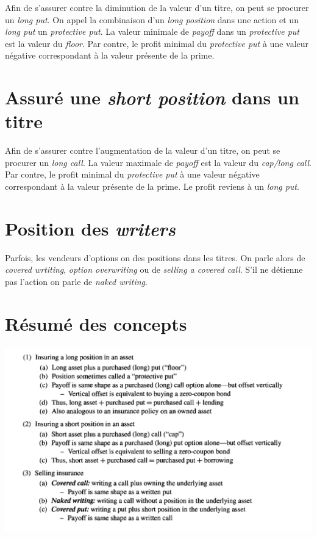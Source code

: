 \documentclass[11pt,french]{report}
\begin{document}
Afin de s'assurer contre la diminution de la valeur d'un titre, on peut se procurer un \emph{long put}. On appel la combinaison d'un \emph{long position} dans une action et un \emph{long put} un \emph{protective put}. La valeur minimale de \emph{payoff} dans un \emph{protective put} est la valeur du \emph{floor}. Par contre, le profit minimal du \emph{protective put} à une valeur négative correspondant à la valeur présente de la prime. 

\section{Assuré une \emph{short position} dans un titre}

Afin de s'assurer contre l'augmentation de la valeur d'un titre, on peut se procurer un \emph{long call}. La valeur maximale de \emph{payoff} est la valeur du \emph{cap/long call}. Par contre, le profit minimal du \emph{protective put} à une valeur négative correspondant à la valeur présente de la prime. Le profit reviens à un \emph{long put}.

\section{Position des \emph{writers}}

Parfois, les vendeurs d'options on des positions dans les titres. On parle alors de \emph{covered wrtiting}, \emph{option overwriting} ou de \emph{selling a covered call}. S'il ne détienne pas l'action on parle de \emph{naked writing}.

\section{Résumé des concepts}

\includegraphics[scale=0.55]{picture24.PNG}
\end{document}
